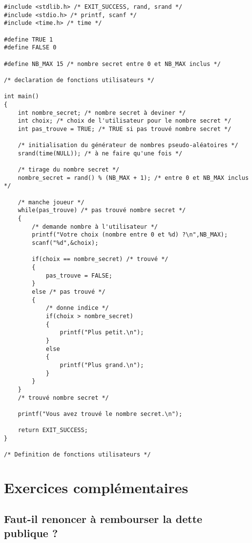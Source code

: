 \begin{correction}
\begin{verbatim}
#include <stdlib.h> /* EXIT_SUCCESS, rand, srand */
#include <stdio.h> /* printf, scanf */
#include <time.h> /* time */

#define TRUE 1
#define FALSE 0

#define NB_MAX 15 /* nombre secret entre 0 et NB_MAX inclus */

/* declaration de fonctions utilisateurs */

int main()
{
    int nombre_secret; /* nombre secret à deviner */
    int choix; /* choix de l'utilisateur pour le nombre secret */
    int pas_trouve = TRUE; /* TRUE si pas trouvé nombre secret */

    /* initialisation du générateur de nombres pseudo-aléatoires */
    srand(time(NULL)); /* à ne faire qu'une fois */

    /* tirage du nombre secret */
    nombre_secret = rand() % (NB_MAX + 1); /* entre 0 et NB_MAX inclus */

    /* manche joueur */
    while(pas_trouve) /* pas trouvé nombre secret */
    {
        /* demande nombre à l'utilisateur */
        printf("Votre choix (nombre entre 0 et %d) ?\n",NB_MAX);
        scanf("%d",&choix);
        
        if(choix == nombre_secret) /* trouvé */
        {
            pas_trouve = FALSE;
        }
        else /* pas trouvé */
        {
            /* donne indice */
            if(choix > nombre_secret)
            {
                printf("Plus petit.\n");
            }
            else
            {
                printf("Plus grand.\n");
            }
        }
    }
    /* trouvé nombre secret */

    printf("Vous avez trouvé le nombre secret.\n");

    return EXIT_SUCCESS;
}

/* Definition de fonctions utilisateurs */
\end{verbatim}
\end{correction}


\section{Exercices complémentaires}

\subsection{Faut-il renoncer à rembourser la dette publique ?}

